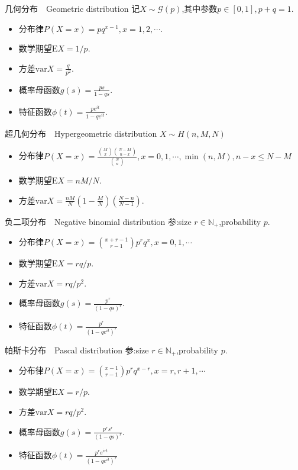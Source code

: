 \begin{frame}{几何分布$\quad$Geometric distribution}
	记$X\sim \mathcal{G}(p)$,其中参数$p\in[0,1],p+q=1.$
	
	\begin{itemize}
		\item 分布律$P(X=x) = pq^{x-1},x = 1,2,\cdots.$
		\item 数学期望$\mathrm{E}X = 1/p.$
		\item 方差$\mathrm{var}X = \frac{q}{p^2}.$
		\item 概率母函数$g(s) = \frac{ps}{1-qs}.$
		\item 特征函数$\phi(t) = \frac{pe^{it}}{1-qe^{it}}.$
	\end{itemize}
\end{frame}

\begin{frame}{超几何分布$\quad$Hypergeometric distribution}
	$X\sim H(n,M,N)$
	
	\begin{itemize}
		\item 分布律$P(X=x) = \frac{\binom{M}{x}\binom{N-M}{n-x}}{\binom{N}{n}},x = 0,1,\cdots,\min(n,M),n-x\leqslant N-M$
		\item 数学期望$\mathrm{E}X = nM/N.$
		\item 方差$\mathrm{var}X = \frac{nM}{N}\left(1-\frac{M}{N}\right)\left(\frac{N-n}{N-1}\right).$
	\end{itemize}
\end{frame}

\begin{frame}{负二项分布$\quad$Negative binomial distribution}
	参:size $r\in\mathbb{N}_+$,probability $p$.
	
	\begin{itemize}
		\item 分布律$P(X=x) = \binom{x+r-1}{r-1}p^rq^{x},x =0,1,\cdots$
		\item 数学期望$\mathrm{E}X = rq/p.$
		\item 方差$\mathrm{var}X = rq/p^2.$
		\item 概率母函数$g(s) = \frac{p^r}{(1-qs)^r}.$
		\item 特征函数$\phi(t) = \frac{p^r}{(1-qe^{it})^r}$
	\end{itemize}
	
\end{frame}


\begin{frame}{帕斯卡分布$\quad$Pascal distribution}
	参:size $r\in\mathbb{N}_+$,probability $p$.
	
	\begin{itemize}
		\item 分布律$P(X=x) = \binom{x-1}{r-1}p^rq^{x-r},x =r,r+1,\cdots$
		\item 数学期望$\mathrm{E}X = r/p.$
		\item 方差$\mathrm{var}X = rq/p^2.$
		\item 概率母函数$g(s) = \frac{p^rs^r}{(1-qs)^r}.$
		\item 特征函数$\phi(t) = \frac{p^re^{irt}}{(1-qe^{it})^r}$
	\end{itemize}


\end{frame}

